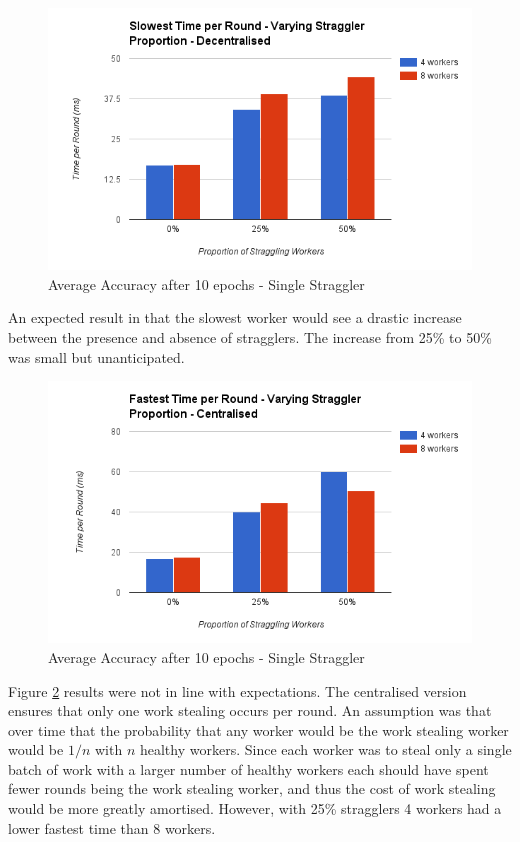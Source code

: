 \documentclass[12pt]{article}
\begin{document}
\begin{figure}[H]
  \centering
  \includegraphics[width=6in]{SlowestStragglerDecentralised}
  \caption[]{Average Accuracy after 10 epochs - Single Straggler}
  \label{SlowestStragglerDecentralised}
\end{figure}

An expected result in that the slowest worker would see a drastic increase between the presence and absence of stragglers. The increase from 25\% to 50\% was small but unanticipated.

\begin{figure}[H]
  \centering
  \includegraphics[width=6in]{FastestStragglerCentralised}
  \caption[]{Average Accuracy after 10 epochs - Single Straggler}
  \label{FastestStragglerCentralised}
\end{figure}

Figure \ref{FastestStragglerCentralised} results were not in line with expectations. The centralised version ensures that only one work stealing occurs per round. An assumption was that over time that the probability that any worker would be the work stealing worker would be $1/n$ with $n$ healthy workers. Since each worker was to steal only a single batch of work with a larger number of healthy workers each should have spent fewer rounds being the work stealing worker, and thus the cost of work stealing would be more greatly amortised. However, with 25\% stragglers 4 workers had a lower fastest time than 8 workers.
\end{document}
